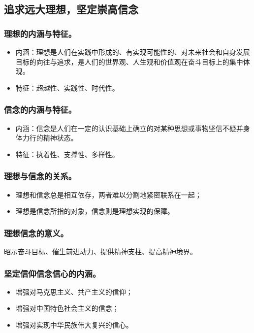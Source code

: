 \documentclass{article}
\begin{document}
\subsection{追求远大理想，坚定崇高信念}

\subsubsection{理想的内涵与特征。}
\begin{itemize}
    \item 内涵：理想是人们在实践中形成的、有实现可能性的、对未来社会和自身发展目标的向往与追求，是人们的世界观、人生观和价值观在奋斗目标上的集中体现。
    \item 特征：超越性、实践性、时代性。
\end{itemize}

\subsubsection{信念的内涵与特征。}
\begin{itemize}
    \item 内涵：信念是人们在一定的认识基础上确立的对某种思想或事物坚信不疑并身体力行的精神状态。
    \item 特征：执着性、支撑性、多样性。
\end{itemize}

\subsubsection{理想与信念的关系。}
\begin{itemize}
    \item 理想和信念总是相互依存，两者难以分割地紧密联系在一起；
    \item 理想是信念所指的对象，信念则是理想实现的保障。
\end{itemize}

\subsubsection{理想信念的意义。}
昭示奋斗目标、催生前进动力、提供精神支柱、提高精神境界。

\subsubsection{坚定信仰信念信心的内涵。}
\begin{itemize}
    \item 增强对马克思主义、共产主义的信仰；
    \item 增强对中国特色社会主义的信念；
    \item 增强对实现中华民族伟大复兴的信心。
\end{itemize}
\end{document}
